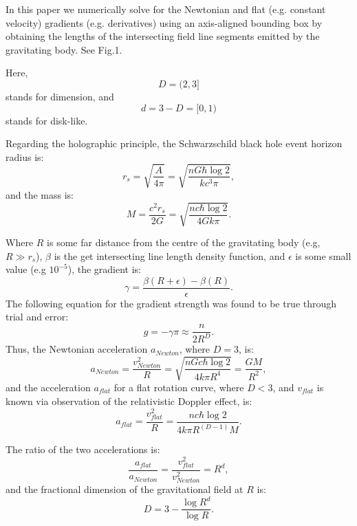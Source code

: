 \documentclass[12pt]{article}
\begin{document}
In this paper we numerically solve for the Newtonian and flat (e.g. constant velocity) gradients (e.g. derivatives) using an axis-aligned bounding box by obtaining the lengths of the intersecting field line segments emitted by the gravitating body. See Fig.1. 

Here, 
\begin{equation}
D = (2, 3]
\end{equation}
stands for dimension, and 
\begin{equation}
d = 3 - D = [0, 1)
\end{equation}
stands for disk-like.

Regarding the holographic principle, the Schwarzschild black hole event horizon radius is:
\begin{equation}
r_s = \sqrt{\frac{A}{4 \pi}} = \sqrt{\frac{n G \hbar \log 2}{k c^3 \pi}},
\end{equation}
and the mass is:
\begin{equation}
M = \frac{c^2 r_s}{2 G} = \sqrt{\frac{n c \hbar \log 2}{4 G k \pi}}. 
\end{equation}

Where $R$ is some far distance from the centre of the gravitating body (e.g, $R \gg r_s$), $\beta$ is the get intersecting line length density function, and $\epsilon$ is some small value (e.g $10^{-5}$), the gradient is:
\begin{equation}
\gamma = \frac{\beta(R + \epsilon) - \beta(R)}{\epsilon}.
\end{equation}
The following equation for the gradient strength was found to be true through trial and error:
\begin{equation}
g = -\gamma \pi \approx \frac{n}{2 R^D}.
\end{equation}
Thus, the Newtonian acceleration $a_{\textit{Newton}}$, where $D = 3$, is:
\begin{equation}
a_{\textit{Newton}} = \frac{v_{\textit{Newton}}^2}{R} = \sqrt{\frac{n G c \hbar \log 2}{4 k \pi R^4}} = \frac{GM}{R^2},
\end{equation}
and the acceleration $a_{\textit{flat}}$ for a flat rotation curve, where $D < 3$, and $v_{\textit{flat}}$ is known via observation of the relativistic Doppler effect, is:
\begin{equation}
a_{\textit{flat}} = \frac{v_{\textit{flat}}^2}{R} = \frac{n c \hbar \log 2}{4 k \pi R^{(D - 1)} M}.
\end{equation}

The ratio of the two accelerations is:
\begin{equation}
\frac{a_{\textit{flat}}}{a_{\textit{Newton}}} = \frac{v_{\textit{flat}}^2}{v_{\textit{Newton}}^2} = R^{d}, 
\end{equation}
and the fractional dimension of the gravitational field at $R$ is:
\begin{equation}
D = 3 - \frac{\log R^d}{\log R}. %
\end{equation}
\end{document}
